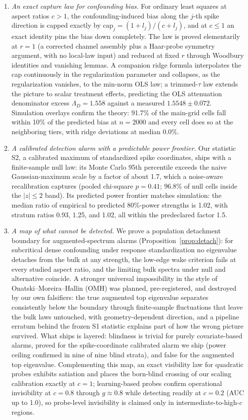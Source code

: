 \begin{enumerate}
\item \emph{An exact capture law for confounding bias.} For ordinary least squares at aspect ratios $c > 1$, the confounding-induced bias along the $j$-th spike direction is capped exactly by $\mathrm{cap}_j = (1+l_j)/(c+l_j)$, and at $c \le 1$ an exact identity pins the bias down completely. The law is proved elementarily at $r=1$ (a corrected channel assembly plus a Haar-probe symmetry argument, with no local-law input) and reduced at fixed $r$ through Woodbury identities and vanishing lemmas. A companion ridge formula interpolates the cap continuously in the regularization parameter and collapses, as the regularization vanishes, to the min-norm OLS law; a trimmed-$\tau$ law extends the picture to scalar treatment effects, predicting the OLS attenuation denominator excess $\Lambda_D = 1.558$ against a measured $1.5548 \pm 0.072$. Simulation overlays confirm the theory: 91.7\% of the main-grid cells fall within 10\% of the predicted bias at $n=2000$ and every cell does so at the neighboring tiers, with ridge deviations at median 0.0\%.
\item \emph{A calibrated detection alarm with a predictable power frontier.} Our statistic S2, a calibrated maximum of standardized spike coordinates, ships with a finite-sample null law: its Monte Carlo 95th percentile exceeds the naive Gaussian-maximum scale by a factor of about 1.7, which a noise-aware recalibration captures (pooled chi-square $p = 0.41$; 96.8\% of null cells inside the $|z| \le 2$ band). Its predicted power frontier matches simulation: the median ratio of empirical to predicted 80\%-power strengths is 1.02, with stratum ratios 0.93, 1.25, and 1.02, all within the predeclared factor 1.5.
\item \emph{A map of what cannot be detected.} We prove a population detachment boundary for augmented-spectrum alarms (Proposition~\ref{prop:detach}): for subcritical dense confounding under response standardization no eigenvalue detaches from the bulk at any strength, the low-edge wake criterion fails at every studied aspect ratio, and the limiting bulk spectra under null and alternative coincide. A stronger universal impossibility in the style of Onatski--Moreira--Hallin (OMH) \citep{onatski2013asymptotic} was planned, pre-registered, and destroyed by our own falsifiers: the true augmented top eigenvalue separates consistently below the boundary through finite-sample fluctuations that leave the bulk laws untouched, with geometry-dependent direction, and a pipeline erratum behind the frozen S1 statistic explains part of how the wrong picture survived. What ships is layered: blindness is trivial for purely covariate-based alarms, proved for the spike-coordinate calibrated alarm we ship (power ceiling confirmed in nine of nine blind strata), and false for the augmented top eigenvalue. Complementing this map, an exact visibility law for quadratic probes exhibits satiation and places the born-blind crossing of our scaling calibration exactly at $c=1$; learning-based probes confirm operational invisibility at $c=0.8$ through $g\approx0.8$ while detecting readily at $c=0.2$ (AUC up to 1.0), so probe-level invisibility is claimed only in intermediate-to-high-$c$ regions.

\end{enumerate}
